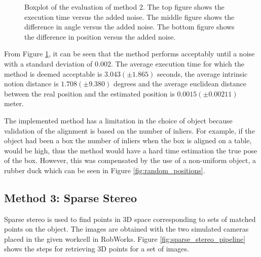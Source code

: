 \documentclass[../main.tex]{subfiles}
\begin{document}
\begin{figure}[H]
    \centering    
    \noindent{}
    \caption{Boxplot of the evaluation of method 2. The top figure shows the execution time versus the added noise. The middle figure shows the difference in angle versus the added noise. The bottom figure shows the difference in position versus the added noise.}
    \label{fig:method3_noise_analysis}
\end{figure}
From Figure \ref{fig:method3_noise_analysis}, it can be seen that the method performs acceptably until a noise with a standard deviation of $0.002$. The average execution time for which the method is deemed acceptable is $3.043(\pm 1.865)$ seconds, the average intrinsic notion distance is $1.708(\pm 9.380)$ degrees and the average euclidean distance between the real position and the estimated position is $0.0015 (\pm 0.00211)$ meter.

The implemented method has a limitation in the choice of object because validation of the alignment is based on the number of inliers. For example, if the object had been a box the number of inliers when the box is aligned on a table, would be high, thus the method would have a hard time estimation the true pose of the box. However, this was compensated by the use of a non-uniform object, a rubber duck \cite{rubber_duck} which can be seen in Figure \ref{fig:random_positions}.

\subsection{Method 3: Sparse Stereo} \label{subsec:method3}
Sparse stereo is used to find points in 3D space corresponding to sets of matched points on the object. The images are obtained with the two simulated cameras placed in the given workcell in RobWorks. Figure \ref{fig:sparse_stereo_pipeline} shows the steps for retrieving 3D points for a set of images.
\end{document}

